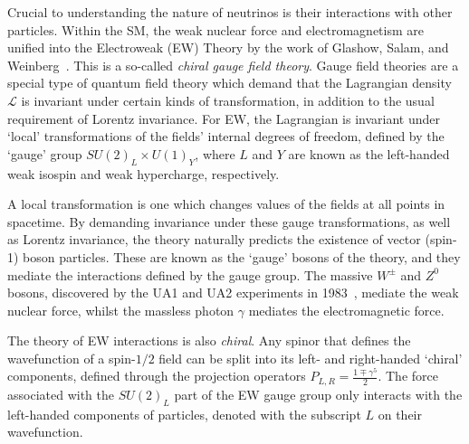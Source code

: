 Crucial to understanding the nature of neutrinos is their interactions with other particles. Within the SM, the weak nuclear force and electromagnetism are unified into the Electroweak (EW) Theory by the work of Glashow, Salam, and Weinberg~\cite{glashowPartialsymmetriesWeakInteractions1961,weinbergModelLeptons1967,salamWeakElectromagneticInteractions1994}. %
This is a so-called \textit{chiral gauge field theory}. Gauge field theories are a special type of quantum field theory which demand that the Lagrangian density $\mathcal{L}$ is invariant under certain kinds of transformation, in addition to the usual requirement of Lorentz invariance. For EW, the Lagrangian is invariant under `local' transformations of the fields' internal degrees of freedom, defined by the `gauge' group $SU(2)_{L}\times U(1)_{Y}$, where $L$ and $Y$ are known as the left-handed weak isospin and weak hypercharge, respectively.

A local transformation is one which changes values of the fields at all points in spacetime. By demanding invariance under these gauge transformations, as well as Lorentz invariance, the theory naturally predicts the existence of vector (spin-1) boson particles. These are known as the `gauge' bosons of the theory, and they mediate the interactions defined by the gauge group. The massive $W^{\pm}$ and $Z^{0}$ bosons, discovered by the UA1 and UA2 experiments in 1983~\cite{arnisonExperimentalObservationIsolated1983,bannerObservationSingleIsolated1983,arnisonExperimentalObservationLepton1983}, %
mediate the weak nuclear force, whilst the massless photon $\gamma$ mediates the electromagnetic force.

The theory of EW interactions is also \textit{chiral}. Any spinor that defines the wavefunction of a spin-$1/2$ field can be split into its left- and right-handed `chiral' components, defined through the projection operators $P_{L,R} = \frac{1\mp\gamma^{5}}{2}$. The force associated with the $SU(2)_{L}$ part of the EW gauge group only interacts with the left-handed components of particles, denoted with the subscript $L$ on their wavefunction.

